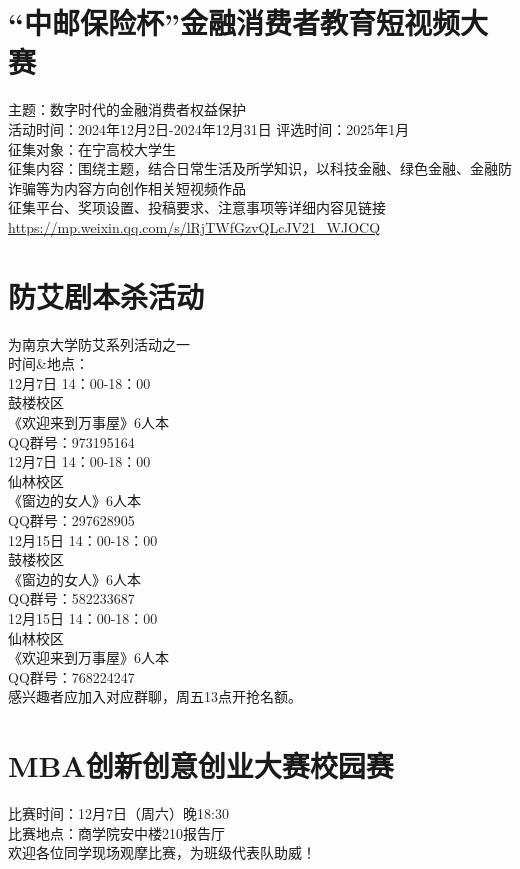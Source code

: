 \documentclass[letterpaper, 12pt]{article}
\begin{document}
\begin{multicols}{2}
\section{“中邮保险杯”金融消费者教育短视频大赛}
主题：数字时代的金融消费者权益保护\\
活动时间：2024年12月2日-2024年12月31日 评选时间：2025年1月\\
征集对象：在宁高校大学生\\
征集内容：围绕主题，结合日常生活及所学知识，以科技金融、绿色金融、金融防诈骗等为内容方向创作相关短视频作品\\
征集平台、奖项设置、投稿要求、注意事项等详细内容见链接\url{https://mp.weixin.qq.com/s/lRjTWfGzvQLcJV21_WJOCQ}\\


\section{防艾剧本杀活动}
为南京大学防艾系列活动之一\\
时间\&地点：\\
12月7日 14：00-18：00\\
鼓楼校区\\
《欢迎来到万事屋》6人本\\
QQ群号：973195164\\
12月7日 14：00-18：00\\
仙林校区\\
《窗边的女人》6人本\\
QQ群号：297628905\\
12月15日 14：00-18：00\\
鼓楼校区\\
《窗边的女人》6人本\\
QQ群号：582233687\\
12月15日 14：00-18：00\\
仙林校区\\
《欢迎来到万事屋》6人本\\
QQ群号：768224247\\
感兴趣者应加入对应群聊，周五13点开抢名额。

\section{MBA创新创意创业大赛校园赛}
比赛时间：12月7日（周六）晚18:30\\
比赛地点：商学院安中楼210报告厅\\
欢迎各位同学现场观摩比赛，为班级代表队助威！\\



\end{multicols}
\end{document}
